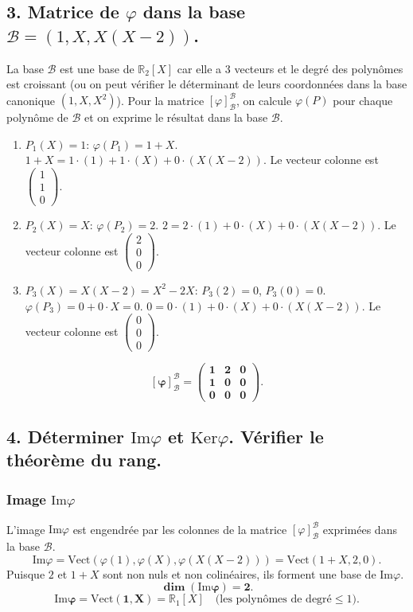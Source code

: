\documentclass[french]{yLectureNote}
\begin{document}
\subsection*{3. Matrice de $\varphi$ dans la base $\mathcal{B} = (1, X, X(X-2))$.}
La base $\mathcal{B}$ est une base de $\mathbb{R}_2[X]$ car elle a 3 vecteurs et le degré des polynômes est croissant (ou on peut vérifier le déterminant de leurs coordonnées dans la base canonique $(1, X, X^2)$).
Pour la matrice $[\varphi]_{\mathcal{B}}^{\mathcal{B}}$, on calcule $\varphi(P)$ pour chaque polynôme de $\mathcal{B}$ et on exprime le résultat dans la base $\mathcal{B}$.
\begin{enumerate}
    \item $P_1(X) = 1$: $\varphi(P_1) = 1+X$.
    $1+X = 1\cdot(1) + 1\cdot(X) + 0\cdot(X(X-2))$.
    Le vecteur colonne est $\begin{pmatrix} 1 \\ 1 \\ 0 \end{pmatrix}$.
    \item $P_2(X) = X$: $\varphi(P_2) = 2$.
    $2 = 2\cdot(1) + 0\cdot(X) + 0\cdot(X(X-2))$.
    Le vecteur colonne est $\begin{pmatrix} 2 \\ 0 \\ 0 \end{pmatrix}$.
    \item $P_3(X) = X(X-2) = X^2-2X$: $P_3(2)=0$, $P_3(0)=0$.
    $\varphi(P_3) = 0 + 0\cdot X = 0$.
    $0 = 0\cdot(1) + 0\cdot(X) + 0\cdot(X(X-2))$.
    Le vecteur colonne est $\begin{pmatrix} 0 \\ 0 \\ 0 \end{pmatrix}$.
\end{enumerate}
$$\mathbf{[\varphi]_{\mathcal{B}}^{\mathcal{B}} = \begin{pmatrix} 1 & 2 & 0 \\ 1 & 0 & 0 \\ 0 & 0 & 0 \end{pmatrix}.}$$

\subsection*{4. Déterminer $\mathrm{Im}\varphi$ et $\mathrm{Ker}\varphi$. Vérifier le théorème du rang.}
\subsubsection*{Image $\mathrm{Im}\varphi$}
L'image $\mathrm{Im}\varphi$ est engendrée par les colonnes de la matrice $[\varphi]_{\mathcal{B}}^{\mathcal{B}}$ exprimées dans la base $\mathcal{B}$.
$$\mathrm{Im}\varphi = \mathrm{Vect}(\varphi(1), \varphi(X), \varphi(X(X-2))) = \mathrm{Vect}(1+X, 2, 0).$$
Puisque $2$ et $1+X$ sont non nuls et non colinéaires, ils forment une base de $\mathrm{Im}\varphi$.
$$\mathbf{\dim(\mathrm{Im}\varphi) = 2}.$$
$$\mathbf{\mathrm{Im}\varphi = \mathrm{Vect}(1, X)} = \mathbb{R}_1[X] \quad \text{(les polynômes de degré} \le 1).$$
\end{document}
